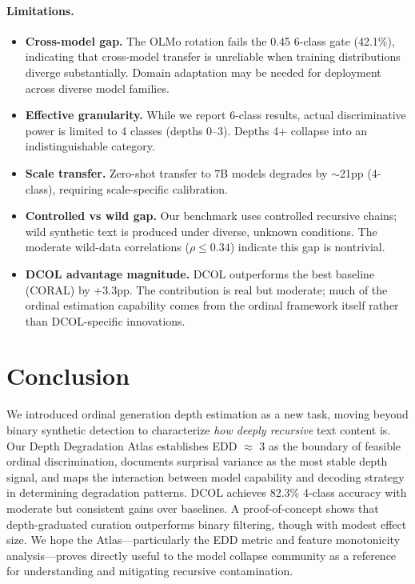 \documentclass[11pt,a4paper]{article}
\begin{document}
\paragraph{Limitations.}
\begin{itemize}[leftmargin=*,topsep=2pt,itemsep=1pt]
\item \textbf{Cross-model gap.} The OLMo rotation fails the 0.45 6-class gate (42.1\%), indicating that cross-model transfer is unreliable when training distributions diverge substantially. Domain adaptation may be needed for deployment across diverse model families.
\item \textbf{Effective granularity.} While we report 6-class results, actual discriminative power is limited to 4 classes (depths 0--3). Depths 4+ collapse into an indistinguishable category.
\item \textbf{Scale transfer.} Zero-shot transfer to 7B models degrades by $\sim$21pp (4-class), requiring scale-specific calibration.
\item \textbf{Controlled vs wild gap.} Our benchmark uses controlled recursive chains; wild synthetic text is produced under diverse, unknown conditions. The moderate wild-data correlations ($\rho \leq 0.34$) indicate this gap is nontrivial.
\item \textbf{DCOL advantage magnitude.} DCOL outperforms the best baseline (CORAL) by +3.3pp. The contribution is real but moderate; much of the ordinal estimation capability comes from the ordinal framework itself rather than DCOL-specific innovations.
\end{itemize}

\section{Conclusion}
\label{sec:conclusion}

We introduced ordinal generation depth estimation as a new task, moving beyond binary synthetic detection to characterize \emph{how deeply recursive} text content is.
Our Depth Degradation Atlas establishes EDD $\approx$ 3 as the boundary of feasible ordinal discrimination, documents surprisal variance as the most stable depth signal, and maps the interaction between model capability and decoding strategy in determining degradation patterns.
DCOL achieves 82.3\% 4-class accuracy with moderate but consistent gains over baselines.
A proof-of-concept shows that depth-graduated curation outperforms binary filtering, though with modest effect size.
We hope the Atlas---particularly the EDD metric and feature monotonicity analysis---proves directly useful to the model collapse community as a reference for understanding and mitigating recursive contamination.
\end{document}
